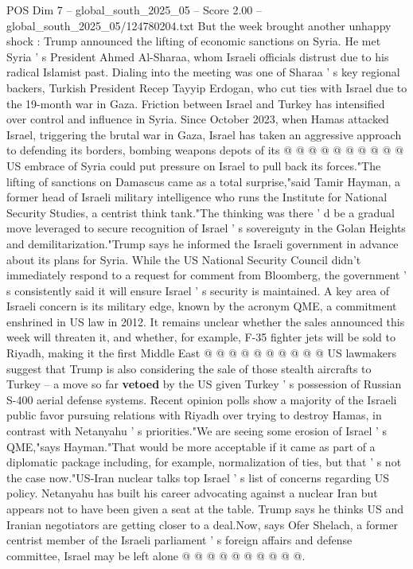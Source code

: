 \begin{textsample}{POS Dim 7 – global\_south\_2025\_05 – Score 2.00 – global\_south\_2025\_05/124780204.txt}
But the week brought another unhappy shock : Trump announced the lifting of economic sanctions on Syria.
He met Syria ' s President Ahmed Al-Sharaa, whom Israeli officials distrust due to his radical Islamist past.
Dialing into the meeting was one of Sharaa ' s key regional backers, Turkish President Recep Tayyip Erdogan, who cut ties with Israel due to the 19-month war in Gaza.
Friction between Israel and Turkey has intensified over control and influence in Syria.
Since October 2023, when Hamas attacked Israel, triggering the brutal war in Gaza, Israel has taken an aggressive approach to defending its borders, bombing weapons depots of its @ @ @ @ @ @ @ @ @ @ US embrace of Syria could put pressure on Israel to pull back its forces."The lifting of sanctions on Damascus came as a total surprise,"said Tamir Hayman, a former head of Israeli military intelligence who runs the Institute for National Security Studies, a centrist think tank."The thinking was there ' d be a gradual move leveraged to secure recognition of Israel ' s sovereignty in the Golan Heights and demilitarization."Trump says he informed the Israeli government in advance about its plans for Syria.
While the US National Security Council didn't immediately respond to a request for comment from Bloomberg, the government ' s consistently said it will ensure Israel ' s security is maintained.
A key area of Israeli concern is its military edge, known by the acronym QME, a commitment enshrined in US law in 2012.
It remains unclear whether the sales announced this week will threaten it, and whether, for example, F-35 fighter jets will be sold to Riyadh, making it the first Middle East @ @ @ @ @ @ @ @ @ @ US lawmakers suggest that Trump is also considering the sale of those stealth aircrafts to Turkey -- a move so far \textbf{vetoed} by the US given Turkey ' s possession of Russian S-400 aerial defense systems.
Recent opinion polls show a majority of the Israeli public favor pursuing relations with Riyadh over trying to destroy Hamas, in contrast with Netanyahu ' s priorities."We are seeing some erosion of Israel ' s QME,"says Hayman."That would be more acceptable if it came as part of a diplomatic package including, for example, normalization of ties, but that ' s not the case now."US-Iran nuclear talks top Israel ' s list of concerns regarding US policy.
Netanyahu has built his career advocating against a nuclear Iran but appears not to have been given a seat at the table.
Trump says he thinks US and Iranian negotiators are getting closer to a deal.Now, says Ofer Shelach, a former centrist member of the Israeli parliament ' s foreign affairs and defense committee, Israel may be left alone @ @ @ @ @ @ @ @ @ @.

\end{textsample}
